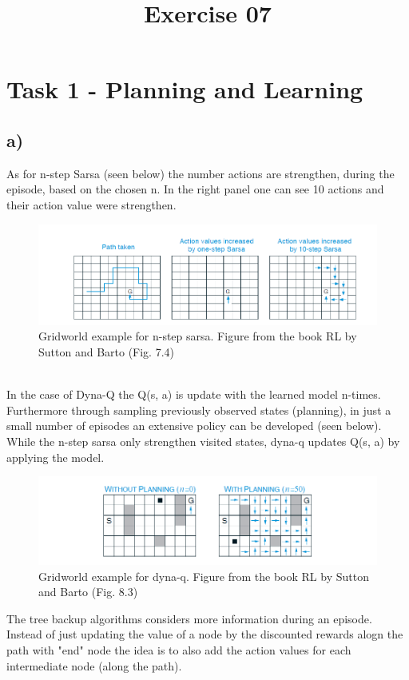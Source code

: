 \documentclass[a4paper]{article}
\date{}
\author{}
\title{\textbf{Exercise 07}}
\begin{document}
	\maketitle 
	\thispagestyle{fancy}
	
    \section*{Task 1 - Planning and Learning}
    	\subsection*{a)}    
    		As for n-step Sarsa (seen below) the number actions are strengthen, during the episode, based on the chosen n. In the right panel one can see 10 actions and their action value were strengthen.	
\begin{figure}[!ht]
	\centering
	\includegraphics[width=0.8\linewidth]{n-step_sarsa} 
	\caption{Gridworld example for n-step sarsa. Figure from the book RL by Sutton and Barto (Fig. 7.4)}
	\label{fig:n-step_sarsa}
\end{figure}
\\
In the case of Dyna-Q the Q(s, a) is update with the learned model n-times. Furthermore through sampling previously observed states (planning), in just a small number of episodes an extensive policy can be developed (seen below). While the n-step sarsa only strengthen visited states, dyna-q updates Q(s, a) by applying the model.
\begin{figure}[!h]
	\centering
	\includegraphics[width=0.8\linewidth]{dyna-q} 
	\caption{Gridworld example for dyna-q. Figure from the book RL by Sutton and Barto (Fig. 8.3)}
	\label{fig:n-step_sarsa}
\end{figure}
\newpage 
The tree backup algorithms considers more information during an episode. Instead of just updating the value of a node by the discounted rewards alogn the path with "end" node the idea is to also add the action values for each intermediate node (along the path).
\end{document}
